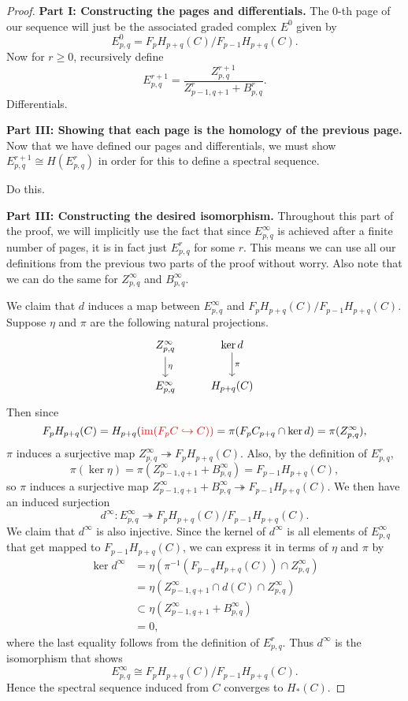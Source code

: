 \documentclass[twoside,10pt]{article}
\begin{document}
\begin{proof}
\textbf{Part I: Constructing the pages and differentials.} The 0-th page of our sequence will just be the associated graded complex $E^{0}$ given by
\[
	E^{0}_{p,q} = F_{p}H_{p+q}(C) / F_{p-1}H_{p+q}(C).
\] 
Now for $r \geq 0$, recursively define
\[
	E^{r+1}_{p,q} = \frac{Z^{r+1}_{p,q}}{ Z^{r}_{p-1,q+1}+B_{p,q}^{r} }.
\] 
{\color{red}Differentials.}

\textbf{Part III: Showing that each page is the homology of the previous page.} Now that we have defined our pages and differentials, we must show $E_{p,q}^{r+1}\cong  H(E_{p,q}^{r})$ in order for this to define a spectral sequence.

{\color{red}Do this.}

\textbf{Part III: Constructing the desired isomorphism.} Throughout this part of the proof, we will implicitly use the fact that since $E_{p,q}^{\infty}$ is achieved after a finite number of pages, it is in fact just $E_{p,q}^{r}$ for some $r$. This means we can use all our definitions from the previous two parts of the proof without worry. Also note that we can do the same for $Z_{p,q}^{\infty}$ and $B_{p,q}^{\infty}$.

We claim that $d$ induces a map between $E^{\infty}_{p,q}$ and $F_{p}H_{p+q}(C)/F_{p-1}H_{p+q}(C)$. Suppose $\eta$ and $\pi$ are the following natural projections.
\[
	\begin{tikzcd}
		Z^{\infty}_{p,q}\dar{\eta}&\ker d\dar{\pi}\\
		E^{\infty}_{p,q}&H_{p+q}(C)
	\end{tikzcd}
\] Then since
\[
	F_{p}H_{p+q}(C) = H_{p+q}( {\color{red} \operatorname{im}(F_{p}C \hookrightarrow C))} = \pi(F_{p}C_{p+q}\cap \ker d)=\pi(Z^{\infty}_{p,q}),
\] 
$\pi$ induces a surjective map $Z^{\infty}_{p,q}\twoheadrightarrow F_{p}H_{p+q}(C)$. Also, by the definition of $E_{p,q}^{r}$,
\[
	\pi(\ker \eta) = \pi(Z^{\infty}_{p-1,q+1}+B^{\infty}_{p,q}) = F_{p-1}H_{p+q}(C),
\] so $\pi$ induces a surjective map $Z^{\infty}_{p-1,q+1}+B^{\infty}_{p,q} \twoheadrightarrow F_{p-1}H_{p+q}(C)$. We then have an induced surjection
\[
	d^{\infty} : E_{p,q}^{\infty} \twoheadrightarrow F_{p}H_{p+q}(C) / F_{p-1}H_{p+q}(C).
\] We claim that $d^{\infty}$ is also injective. Since the kernel of $d^{\infty}$ is all elements of $E_{p,q}^{\infty}$ that get mapped to $F_{p-1}H_{p+q}(C)$, we can express it in terms of $\eta$ and $\pi$ by
\begin{align*}
	\ker d^{\infty} &= \eta\left( \pi^{-1}\left( F_{p-q}H_{p+q}(C) \right) \cap Z_{p,q}^{\infty} \right)\\
			&= \eta\left( Z^{\infty}_{p-1,q+1} \cap d(C) \cap Z_{p,q}^{\infty} \right) \\
			&\subset \eta\left( Z^{\infty}_{p-1,q+1} + B_{p,q}^{\infty} \right) \\
			&= 0,
\end{align*}
where the last equality follows from the definition of $E_{p,q}^{r}$. Thus $d^{\infty}$ is the isomorphism that shows
\[
	E_{p,q}^{\infty} \cong F_{p}H_{p+q}(C) / F_{p-1}H_{p+q}(C).
\] 
Hence the spectral sequence induced from $C$ converges to $H_{*}(C)$.
\end{proof}
\end{document}
